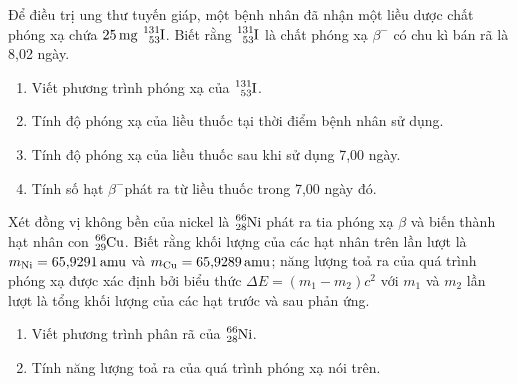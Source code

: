 \begin{ex}
	Để điều trị ung thư tuyến giáp, một bệnh nhân đã nhận một liều dược chất phóng xạ chứa $\SI{25}{\milli\gram}\  \ce{_{53}^{131}I}$. Biết rằng $\ce{_{53}^{131}I}$ là chất phóng xạ $\beta^{-}$ có chu kì bán rã là 8,02 ngày.
	\begin{enumerate}[label=\alph*)]
		\item Viết phương trình phóng xạ của $\ce{_{53}^{131}I}$.
		\item Tính độ phóng xạ của liều thuốc tại thời điểm bệnh nhân sử dụng.
		\item Tính độ phóng xạ của liều thuốc sau khi sử dụng 7,00 ngày.
		\item Tính số hạt $\beta^{-}$phát ra từ liều thuốc trong 7,00 ngày đó.
	\end{enumerate}
\end{ex}
\begin{ex}
	Xét đồng vị không bền của nickel là $\ce{_{28}^{66}Ni}$ phát ra tia phóng xạ $\beta$ và biến thành hạt nhân con $\ce{_{29}^{66}Cu}$. Biết rằng khối lượng của các hạt nhân trên lần lượt là $m_{\ce{Ni}}=\SI{65.9291}{amu}$ và $m_{\ce{Cu}}=\SI{65.9289}{amu}$; năng lượng toả ra của quá trình phóng xạ được xác định bởi biểu thức $\Delta E=\left(m_1-m_2\right) c^2$ với $m_1$ và $m_2$ lần lượt là tổng khối lượng của các hạt trước và sau phản ứng.
	\begin{enumerate}[label=\alph*)]
		\item Viết phương trình phân rã của $\ce{_{28}^{66}Ni}$.
		\item Tính năng lượng toả ra của quá trình phóng xạ nói trên.
	\end{enumerate}
\end{ex}

